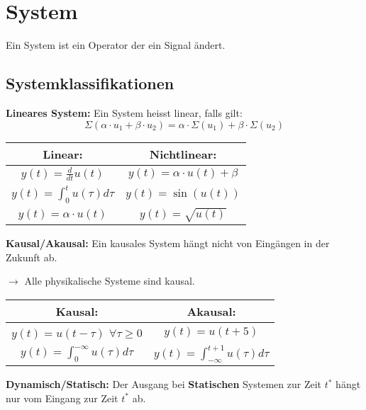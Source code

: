 \section{System}

    Ein System ist ein Operator der ein Signal ändert.
    \subsection{Systemklassifikationen}
        \textbf{Lineares System:}
                Ein System heisst linear, falls gilt: 
                \[\Sigma (\alpha \cdot u_1 + \beta \cdot u_2) = \alpha \cdot \Sigma (u_1) + \beta \cdot \Sigma(u_2)\]   
            \begin{center}
            \begin{tabular}{ c c }
                \textbf{Linear:} & \textbf{Nichtlinear:} \\ 
                \hline
                $ y(t) = \frac{d}{dt}u(t)$& $ y(t) = \alpha \cdot u(t) + \beta $ \\  
                \hline
                $y(t) = \int_0^t u(\tau)d\tau$ & $ y(t) = \sin{\left(u(t)\right)}$ \\
                \hline
                $y(t) = \alpha\cdot u(t)$ & $y(t) = \sqrt{u(t)}$
            \end{tabular}
            \end{center}
        \textbf{Kausal/Akausal:} Ein kausales System hängt nicht von Eingängen in der Zukunft ab.
        
        $\rightarrow$ Alle physikalische Systeme sind kausal.
        
        \begin{center}
        \begin{tabular}{ c c }
            \textbf{Kausal:} & \textbf{Akausal:} \\ 
                \hline
                $ y(t) = u(t -\tau)$ 
                   $ \forall\tau \geq 0 $ & $y(t) = u(t+5) $ \\  
                \hline
                $y(t) = \int_0^{-\infty} u(\tau)d\tau$ & $ y(t) = \int_{-\infty}^{t+1}u(\tau) d\tau $
        \end{tabular}
        \end{center}
    \textbf{Dynamisch/Statisch:}
        Der Ausgang bei \textbf{Statischen} Systemen zur Zeit $t^*$ hängt nur vom Eingang zur Zeit $t^*$ ab.
        
